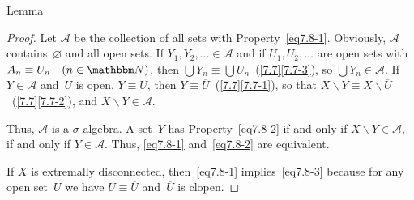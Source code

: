 \documentclass[main.tex]{subfiles}
\begin{document}
%
%
\begin{psec}{7.8}{Lemma}



\end{psec}
\begin{proof}
Let $\mathcal A$ be the collection
of all sets with Property~\eqref{eq7.8-1}.
Obviously, $\mathcal A$ contains~$\varnothing$
and all open sets.
If $Y_1,Y_2,\dotsc \in\mathcal A$
and if $U_1,U_2,\dotsc$ are open sets with $A_n\equiv U_n\quad(n\in\N)$,
then $\bigcup Y_n\equiv \bigcup U_n$~(\ref{7.7}\ref{7.7-3}),
so $\bigcup Y_n\in\mathcal A$.
If $Y\in\mathcal A$ and~$U$ is open,
$Y\equiv U$,
then $Y\equiv \overline U$~(\ref{7.7}\ref{7.7-1}),
so that $X\backslash Y\equiv X\backslash\overline U$~(\ref{7.7}\ref{7.7-2}),
and $X\backslash Y\in\mathcal A$.

Thus, $\mathcal A$ is a $\sigma$-algebra.
A set~$Y$ has Property~\eqref{eq7.8-2}
if and only if $X\backslash Y\in\mathcal A$,
if and only if $Y\in\mathcal A$.
Thus, \eqref{eq7.8-1} and~\eqref{eq7.8-2} are equivalent.

If $X$ is extremally disconnected,
then~\eqref{eq7.8-1} implies~\eqref{eq7.8-3}
because for any open set~$U$
we have $U\equiv\overline U$ and~$\overline U$ is clopen. \xqed
\end{proof}
%
%
%
\clearpage
\end{document}
